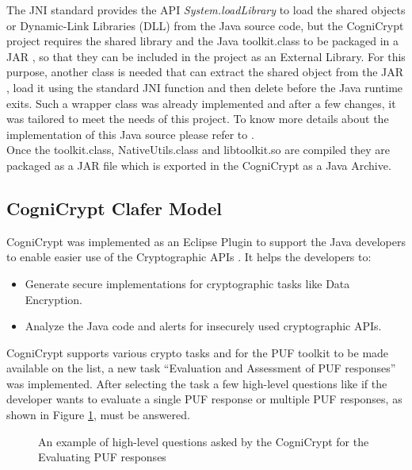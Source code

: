 The JNI standard provides the API \emph{System.loadLibrary} to load the shared objects or Dynamic-Link Libraries (DLL) from the Java source code, but the CogniCrypt project requires the shared library and the Java toolkit.class to be packaged in a JAR , so that they can be included in the project as an External Library. For this purpose, another class is needed that can extract the shared object from the JAR , load it using the standard JNI function and then delete before the Java runtime exits. Such
a wrapper class was already implemented and after a few changes, it was tailored to meet the needs of this project. To know more details about the implementation of this Java source please refer to \cite{nativeutils}.\\

Once the toolkit.class, NativeUtils.class and libtoolkit.so are compiled they are packaged as a JAR file which is exported in the CogniCrypt as a Java Archive.

\subsection{CogniCrypt Clafer Model}
CogniCrypt was implemented as an Eclipse Plugin to support the Java developers to enable easier use of the Cryptographic APIs \cite{cogni}. It helps the developers to:
\begin{itemize}
	\item Generate secure implementations for cryptographic tasks like Data Encryption.
	\item Analyze the Java code and alerts for insecurely used cryptographic APIs.
\end{itemize}

CogniCrypt supports various crypto tasks and for the PUF toolkit to be made available on the list, a new task ``Evaluation and Assessment of PUF responses'' was implemented. After selecting the task a few high-level questions like if the developer wants to evaluate a single PUF response or multiple PUF responses, as shown in Figure \ref{img:cogni_ques}, must be answered.\\

\begin{figure}[h]
\centering
{}
\caption{An example of high-level questions asked by the CogniCrypt for the Evaluating PUF responses}
\label{img:cogni_ques}
\end{figure}

